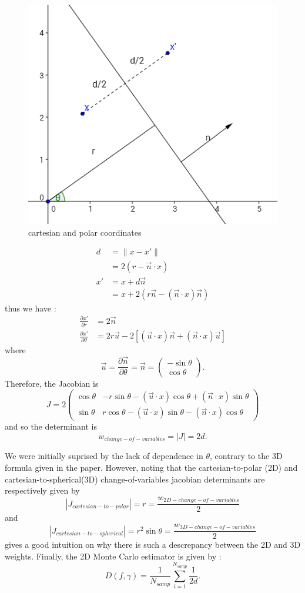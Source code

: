 \documentclass[10pt,a4paper]{article}			%
\begin{document}
\begin{figure}
\includegraphics[scale=0.6]{img/definitions.png}
\caption{cartesian and polar coordinates}
\label{definitions}
\end{figure}

\begin{align*}
 d & = \lVert x-x' \rVert  \\
& = 2(r-\vec{n}\cdot x) \\
x' &= x+ d\vec{n}\\
&= x+ 2(r\vec{n} - (\vec{n}\cdot x)\vec{n})
\end{align*}
thus we have :
\begin{align*}
\frac{\partial x'}{\partial r}&=2\vec{n}\\
\frac{\partial x'}{\partial \theta}&= 2r\vec{u}-2[(\vec{u}\cdot x)\vec{n}+(\vec{n}\cdot x)\vec{u}]
\end{align*}
where 
\[\vec{u}=\frac{\partial \vec{n}}{\partial \theta} = \vec{n}=\begin{pmatrix}-\sin\theta \\ \cos\theta\end{pmatrix}.\]
Therefore, the Jacobian is
\[J = 2
\begin{pmatrix}
\cos\theta & -r\sin\theta-(\vec{u}\cdot x)\cos\theta+(\vec{n}\cdot x)\sin\theta\\
\sin\theta &  r \cos\theta - (\vec{u}\cdot x)\sin\theta - (\vec{n}\cdot x)\cos\theta
\end{pmatrix}\]
and so the determinant is
\[w_{change-of-variables} = |J| = 2d.\]

We were initially suprised by the lack of dependence in $\theta$, contrary to the 3D formula given in the paper. However, noting that the cartesian-to-polar (2D) and cartesian-to-spherical(3D) change-of-variables jacobian determinants are respectively given by \[|J_{cartesian-to-polar}| = r=\frac{w_{2D-change-of-variables}}{2}\] and \[|J_{cartesian-to-spherical}|=r^2\sin\theta=\frac{w_{3D-change-of-variables}}{2}\] gives a good intuition on why there is such a descrepancy between the 2D and 3D weights. Finally, the 2D Monte Carlo estimator is given by :\[D(f,\gamma) = \frac{1}{N_{samp}} \sum_{i=1}^{N_{samp}}\frac{1}{2d}.\]
\end{document}
